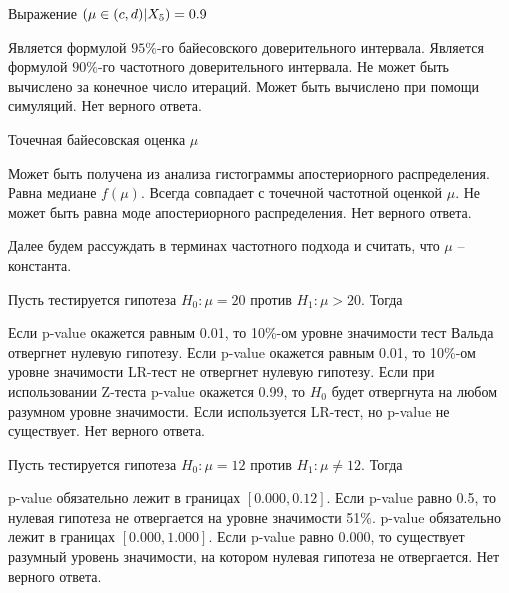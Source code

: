 \documentclass[10pt, a4paper]{exam}
\let\P\relax
\DeclareMathOperator{\P}{\mathbb{P}}
\begin{document}
\begin{questions}
		\question Выражение $\P(\mu \in (c, d) | X_5) = 0.9$
		\begin{choices}
			\choice Является формулой $95\%$-го байесовского доверительного интервала.
			\choice Является формулой $90\%$-го частотного доверительного интервала.
			\choice Не может быть вычислено за конечное число итераций. 
			\choice Может быть вычислено при помощи симуляций. 
			\choice Нет верного ответа.
		\end{choices}
	
		\question Точечная байесовская оценка $\mu$
		\begin{choices}
			\choice Может быть получена из анализа гистограммы апостериорного распределения.
			\choice Равна медиане $f(\mu)$.
			\choice Всегда совпадает с точечной частотной оценкой $\mu$.
			\choice Не может быть равна моде апостериорного распределения.
			\choice Нет верного ответа.
		\end{choices}
		\vspace{1em}
	
		Далее будем рассуждать в терминах частотного подхода и считать, что $\mu$ -- константа.
		\vspace{1em}
		
		\question Пусть тестируется гипотеза $H_0: \mu = 20$ против $H_1: \mu > 20$. Тогда
		\begin{choices}
			\choice Если p-value окажется равным 0.01, то 10\%-ом уровне значимости тест Вальда отвергнет нулевую гипотезу. 
			\choice Если p-value окажется равным 0.01, то 10\%-ом уровне значимости LR-тест не отвергнет нулевую гипотезу. 
			\choice Если при использовании Z-теста p-value окажется 0.99, то $H_0$ будет отвергнута на любом разумном уровне значимости.
			\choice Если используется LR-тест, но p-value не существует.
			\choice Нет верного ответа.
		\end{choices}
	
		\question Пусть тестируется гипотеза $H_0: \mu = 12$ против $H_1: \mu \ne 12$. Тогда
		\begin{choices}
			\choice p-value обязательно лежит в границах $[0.000, 0.12]$.
			\choice Если p-value равно 0.5, то нулевая гипотеза не отвергается на уровне значимости 51\%.
			\choice p-value обязательно лежит в границах $[0.000, 1.000]$.
			\choice Если p-value равно 0.000, то существует разумный уровень значимости, на котором нулевая гипотеза не отвергается.
			\choice Нет верного ответа.
		\end{choices}
	\end{questions}
	
\end{document}
